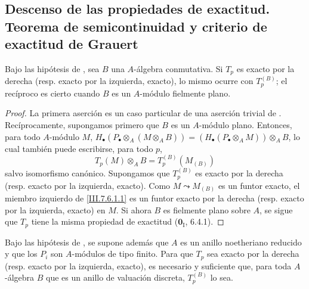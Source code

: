 \subsection{Descenso de las propiedades de exactitud. Teorema de
semicontinuidad y criterio de exactitud de Grauert}
\label{subsection:III.7.6}
\label{subsection:III.7.6.fr}
\label{III.7.6}

\begin{proposition}[7.6.1]
\label{III.7.6.1}
Bajo las hipótesis de , sea $B$ una $A$-álgebra
conmutativa. Si $T_p$ es exacto por la derecha (resp.
exacto por la izquierda, exacto), lo mismo ocurre con $T_p^{(B)}$;
el recíproco es cierto cuando $B$ es un $A$-módulo fielmente plano.
\end{proposition}

\begin{proof}
La primera aserción es un caso particular de una aserción trivial de
. Recíprocamente, supongamos primero que $B$ es un
$A$-módulo plano. Entonces, para todo $A$-módulo $M$,
$H_\bullet(P_\bullet\otimes_A(M\otimes_A B))=(H_\bullet(P_\bullet\otimes_A M))\otimes_A B$,
lo cual también puede escribirse, para todo $p$,
\[
  T_p(M)\otimes_A B
  =
  T_p^{(B)}(M_{(B)})
  \tag{7.6.1.1}\label{III.7.6.1.1.fr}
\]
salvo isomorfismo canónico. Supongamos que $T_p^{(B)}$ es exacto por
la derecha (resp. exacto por la izquierda, exacto). Como
$M\leadsto M_{(B)}$ es un funtor exacto, el miembro izquierdo de
\eqref{III.7.6.1.1} es un funtor exacto por la derecha
(resp. exacto por la izquierda, exacto) en $M$. Si ahora
$B$ es fielmente plano sobre $A$, se sigue que $T_p$ tiene la misma propiedad de exactitud ($\mathbf{0}_{\mathrm I}$, 6.4.1).
\end{proof}

\begin{proposition}[7.6.2]
\label{III.7.6.2}
Bajo las hipótesis de , se supone además que $A$ es
un anillo noetheriano reducido y que los $P_i$ son $A$-módulos de
tipo finito. Para que $T_p$ sea exacto por la derecha \textup{(resp.} exacto por la izquierda, exacto), es necesario y suficiente
que, para toda $A$-álgebra $B$ que es un anillo de valuación discreta,
$T_p^{(B)}$ lo sea.
\end{proposition}


